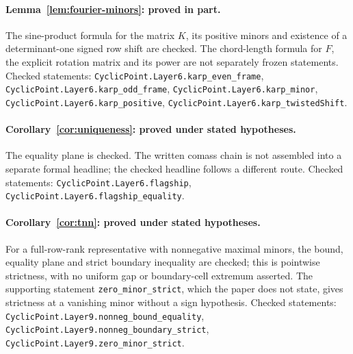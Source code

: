 \documentclass[11pt]{article}
\begin{document}
\paragraph{Lemma~\ref{lem:fourier-minors}: proved in part.}
The sine-product formula for the matrix $K$, its positive minors and existence of a determinant-one signed row shift are checked. The chord-length formula for $F$, the explicit rotation matrix and its power are not separately frozen statements.
Checked statements: \texttt{CyclicPoint.\allowbreak Layer6.\allowbreak karp\_\allowbreak even\_\allowbreak frame}, \texttt{CyclicPoint.\allowbreak Layer6.\allowbreak karp\_\allowbreak odd\_\allowbreak frame}, \texttt{CyclicPoint.\allowbreak Layer6.\allowbreak karp\_\allowbreak minor}, \texttt{CyclicPoint.\allowbreak Layer6.\allowbreak karp\_\allowbreak positive}, \texttt{CyclicPoint.\allowbreak Layer6.\allowbreak karp\_\allowbreak twistedShift}.

\paragraph{Corollary~\ref{cor:uniqueness}: proved under stated hypotheses.}
The equality plane is checked. The written comass chain is not assembled into a separate formal headline; the checked headline follows a different route.
Checked statements: \texttt{CyclicPoint.\allowbreak Layer6.\allowbreak flagship}, \texttt{CyclicPoint.\allowbreak Layer6.\allowbreak flagship\_\allowbreak equality}.

\paragraph{Corollary~\ref{cor:tnn}: proved under stated hypotheses.}
For a full-row-rank representative with nonnegative maximal minors, the bound, equality plane and strict boundary inequality are checked; this is pointwise strictness, with no uniform gap or boundary-cell extremum asserted. The supporting statement \texttt{zero\_minor\_strict}, which the paper does not state, gives strictness at a vanishing minor without a sign hypothesis.
Checked statements: \texttt{CyclicPoint.\allowbreak Layer9.\allowbreak nonneg\_\allowbreak bound\_\allowbreak equality}, \texttt{CyclicPoint.\allowbreak Layer9.\allowbreak nonneg\_\allowbreak boundary\_\allowbreak strict}, \texttt{CyclicPoint.\allowbreak Layer9.\allowbreak zero\_\allowbreak minor\_\allowbreak strict}.
\end{document}
